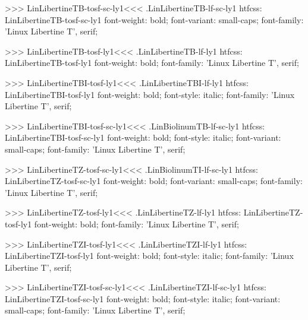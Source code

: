 {{{>>>
\<LinLibertineTB-tosf-sc-ly1\><<<
.LinLibertineTB-lf-sc-ly1
htfcss:  LinLibertineTB-tosf-sc-ly1  font-weight: bold; font-variant: small-caps; font-family: 'Linux Libertine T', serif;

>>>
\<LinLibertineTB-tosf-ly1\><<<
.LinLibertineTB-lf-ly1
htfcss:  LinLibertineTB-tosf-ly1  font-weight: bold; font-family: 'Linux Libertine T', serif;

>>>
\<LinLibertineTBI-tosf-ly1\><<<
.LinLibertineTBI-lf-ly1
htfcss:  LinLibertineTBI-tosf-ly1  font-weight: bold; font-style: italic; font-family: 'Linux Libertine T', serif;

>>>
\<LinLibertineTBI-tosf-sc-ly1\><<<
.LinBiolinumTB-lf-sc-ly1
htfcss:  LinLibertineTBI-tosf-sc-ly1  font-weight: bold; font-style: italic; font-variant: small-caps; font-family: 'Linux Libertine T', serif;

>>>
\<LinLibertineTZ-tosf-sc-ly1\><<<
.LinBiolinumTI-lf-sc-ly1
htfcss:  LinLibertineTZ-tosf-sc-ly1  font-weight: bold; font-variant: small-caps; font-family: 'Linux Libertine T', serif;

>>>
\<LinLibertineTZ-tosf-ly1\><<<
.LinLibertineTZ-lf-ly1
htfcss:  LinLibertineTZ-tosf-ly1  font-weight: bold; font-family: 'Linux Libertine T', serif;

>>>
\<LinLibertineTZI-tosf-ly1\><<<
.LinLibertineTZI-lf-ly1
htfcss:  LinLibertineTZI-tosf-ly1  font-weight: bold; font-style: italic; font-family: 'Linux Libertine T', serif;

>>>
\<LinLibertineTZI-tosf-sc-ly1\><<<
.LinLibertineTZI-lf-sc-ly1
htfcss:  LinLibertineTZI-tosf-sc-ly1  font-weight: bold; font-style: italic; font-variant: small-caps; font-family: 'Linux Libertine T', serif;

}}}
